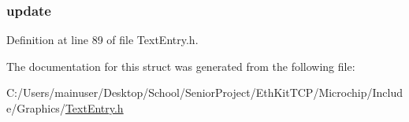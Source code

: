 \subsubsection[{update}]{ update}\label{struct_k_e_y_m_e_m_b_e_r_ae0027ff2f19db0b2b4959a23b34ff53f}


Definition at line 89 of file Text\+Entry.\+h.



The documentation for this struct was generated from the following file\+:\begin{DoxyCompactItemize}
\item 
C\+:/\+Users/mainuser/\+Desktop/\+School/\+Senior\+Project/\+Eth\+Kit\+T\+C\+P/\+Microchip/\+Include/\+Graphics/\hyperlink{_text_entry_8h}{Text\+Entry.\+h}\end{DoxyCompactItemize}
